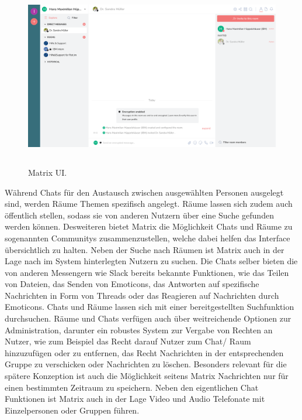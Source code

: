 \begin{figure}[htb]
    \centering
    \includegraphics[height=8cm]{graphics/unknown-3.png}
    \caption[Matrix UI]{Matrix UI.\footnotemark}
    \label{abb:UI}
\end{figure}

Während Chats für den Austausch zwischen ausgewählten Personen ausgelegt sind, werden Räume Themen spezifisch angelegt. Räume lassen sich zudem auch öffentlich stellen, sodass sie von anderen Nutzern über eine Suche gefunden werden können. Desweiteren bietet Matrix die Möglichkeit Chats und Räume zu sogenannten Communitys zusammenzustellen, welche dabei helfen das Interface übersichtlich zu halten.
Neben der Suche nach Räumen ist Matrix auch in der Lage nach im System hinterlegten Nutzern zu suchen. Die Chats selber bieten die von anderen Messengern wie Slack bereits bekannte Funktionen, wie das Teilen von Dateien, das Senden von Emoticons, das Antworten auf spezifische Nachrichten in Form von Threads oder das Reagieren auf Nachrichten durch Emoticons. Chats und Räume lassen sich mit einer bereitgestellten Suchfunktion durchsuchen. Räume und Chats verfügen auch über weitreichende Optionen zur Administration, darunter ein robustes System zur Vergabe von Rechten an Nutzer, wie zum Beispiel das Recht darauf Nutzer zum Chat/ Raum hinzuzufügen oder zu entfernen, das Recht Nachrichten in der entsprechenden Gruppe zu verschicken oder Nachrichten zu löschen. Besonders relevant für die spätere Konzeption ist auch die Möglichkeit seitens Matrix Nachrichten nur für einen bestimmten Zeitraum zu speichern.
Neben den eigentlichen Chat Funktionen ist Matrix auch in der Lage Video und Audio Telefonate mit Einzelpersonen oder Gruppen führen.

